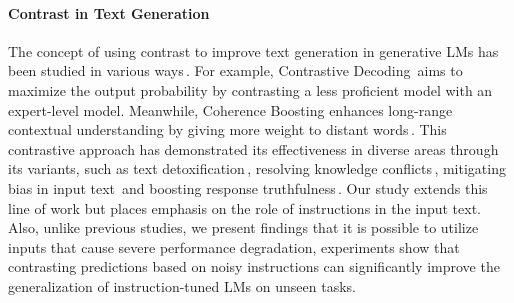 \paragraph{Contrast in Text Generation} The concept of using contrast to improve text generation in generative LMs has been studied in various ways\,\citep{contrastive_decoding, contrastive_input_decoding, dexperts, coherence_boosting}. For example, Contrastive Decoding\,\citep{contrastive_decoding} aims to maximize the output probability by contrasting a less proficient model with an expert-level model.  Meanwhile, Coherence Boosting enhances long-range contextual understanding by giving more weight to distant words\,\citep{coherence_boosting}. This contrastive approach has demonstrated its effectiveness in diverse areas through its variants, such as text detoxification\,\citep{dexperts}, resolving knowledge conflicts\,\citep{context_aware_decoding}, mitigating bias in input text\,\citep{contrastive_input_decoding} and boosting response truthfulness\,\citep{dola_contrastive_decoding}. Our study extends this line of work but places emphasis on the role of instructions in the input text. Also, unlike previous studies, we present findings that it is possible to utilize inputs that cause severe performance degradation, experiments show that contrasting predictions based on noisy instructions can significantly improve the generalization of instruction-tuned LMs on unseen tasks.